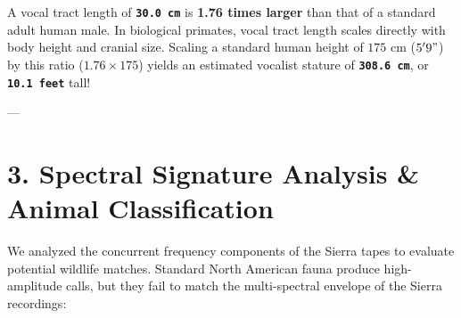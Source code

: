 \documentclass[11pt,twocolumn]{article}
\begin{document}
A vocal tract length of \textbf{\texttt{30.0 cm}} is \textbf{1.76 times larger} than that of a standard adult human male. In biological primates, vocal tract length scales directly with body height and cranial size. Scaling a standard human height of $175 \text{ cm}$ ($5'9"$) by this ratio ($1.76 \times 175$) yields an estimated vocalist stature of \textbf{\texttt{308.6 cm}}, or \textbf{\texttt{10.1 feet}} tall!

---

\section{3. Spectral Signature Analysis & Animal Classification}
We analyzed the concurrent frequency components of the Sierra tapes to evaluate potential wildlife matches. Standard North American fauna produce high-amplitude calls, but they fail to match the multi-spectral envelope of the Sierra recordings:
\end{document}
